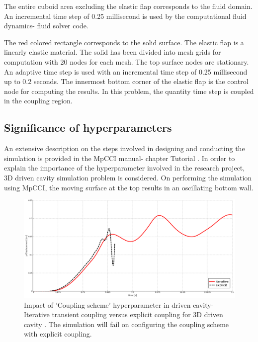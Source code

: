 
The entire cuboid area excluding the elastic flap corresponds to the fluid domain. An incremental time step of 0.25 millisecond is used by the computational fluid dynamics- fluid solver code. 


The red colored rectangle corresponds to the solid surface. The elastic flap is a linearly elastic material. The solid has been divided into mesh grids for computation with 20 nodes for each mesh. The top surface nodes are stationary. An adaptive time step is used with an incremental time step of 0.25 millisecond up to 0.2 seconds.  The innermost bottom corner of the elastic flap is the control node for computing the results. In this problem, the quantity time step is coupled in the coupling region.

\subsection{Significance of hyperparameters}

An extensive description on the steps involved in designing and conducting the simulation is provided in the MpCCI manual- chapter Tutorial \cite{MpCCI_documentation}. In order to explain the importance of the hyperparameter involved in the research project, 3D driven cavity simulation problem is considered. On performing the simulation using MpCCI, the moving surface at the top results in an oscillating bottom wall.  

\begin{figure}[!ht]
\centering
\includegraphics[width=\textwidth]{images/driven_cavity_result1.png}
\captionsetup{justification=justified}
\caption[An illustration of the significance of hyperparameters]{Impact of 'Coupling scheme' hyperparameter in driven cavity- Iterative transient coupling versus explicit coupling for 3D driven cavity \cite{MpCCI_documentation}. The simulation will fail on configuring the coupling scheme with explicit coupling.}
\label{Fig:iterative_vs_explicit}
\end{figure}

